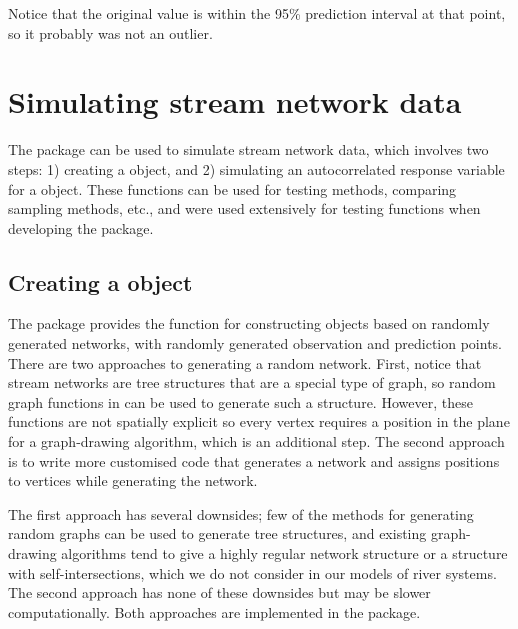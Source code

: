 \documentclass[nojss]{jss}
\begin{document}
Notice that the original value is within the 95\% prediction
interval at that point, so it probably was not an outlier.

%
%

\section{Simulating stream network data}\label{Simulation}

The  package can be used to simulate stream network data,
which involves two steps: 1) creating a 
object, and 2) simulating an autocorrelated response variable for a
 object. These functions can be used for
testing methods, comparing sampling methods, etc., and were used
extensively for testing functions when developing the 
package.


\subsection[Creating a SpatialStreamNetwork object]{Creating a  object}

The  package provides the function  for
constructing  objects based on randomly
generated networks, with randomly generated observation and prediction
points. There are two approaches to generating a random
network. First, notice that stream networks are tree structures that
are a special type of graph, so random graph functions in 
can be used to generate such a structure. However, these functions are
not spatially explicit so every vertex requires a position in the
plane for a graph-drawing algorithm, which is an additional step. The
second approach is to write more customised code that generates a
network and assigns positions to vertices while generating the
network.

The first approach has several downsides; few of the methods for
generating random graphs can be used to generate tree structures, and
existing graph-drawing algorithms tend to give a highly regular
network structure or a structure with self-intersections, which we do not consider in our models of river systems. The second approach has none of these
downsides but may be slower computationally. Both approaches are
implemented in the  package.
\end{document}
